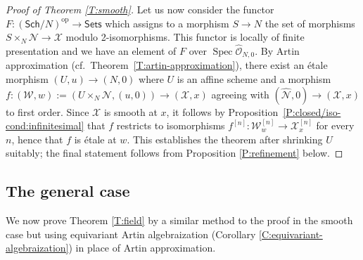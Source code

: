 \documentclass[a4paper]{amsart}
\theoremstyle{plain}
\theoremstyle{definition}
\theoremstyle{remark}
\numberwithin{equation}{section}
\newcommand{\op}{\mathrm{op}} %
\newcommand\cN{\mathcal{N}}
\newcommand\cW{\mathcal{W}}
\newcommand\cX{\mathcal{X}}
\newcommand\oh{\mathcal{O}}
\newcommand\co{\colon}
\DeclareMathOperator{\Spec}{Spec}
\newcommand\Sets{\mathsf{Sets}}
\renewcommand{\hat}{\widehat}
\newcommand{\Sch}{\mathsf{Sch}}
\begin{document}
\begin{proof}[Proof of Theorem \ref{T:smooth}]
Let us now consider the functor $F \co (\Sch/N)^\op \to \Sets$ which assigns to a
morphism $S \to N$ the set of morphisms $S \times_N \cN \to \cX$ modulo
2-isomorphisms.  This functor is locally of finite presentation and we have an
element of $F$ over $\Spec \hat{\oh}_{N,0}$.  By Artin approximation
\cite[Cor.~2.2]{artin-approx} (cf.\ Theorem~\ref{T:artin-approximation}), there
exist an \'etale morphism $(U,u) \to
(N,0)$ where $U$ is an affine scheme and a morphism $f\colon (\cW,w):=(U
\times_N \cN, (u,0) ) \to (\cX,x)$ agreeing with $(\hat{\cN},0) \to (\cX,x)$ to
first order.  Since $\cX$ is smooth at $x$, it follows by
Proposition~\ref{P:closed/iso-cond:infinitesimal} that $f$ restricts to isomorphisms
$f^{[n]}\colon \cW_w^{[n]}\to \cX_x^{[n]}$ for every $n$, hence that $f$ is \'etale at $w$.
This establishes the theorem after shrinking $U$ suitably; the final statement
follows from Proposition \ref{P:refinement}
below.
\end{proof}


\subsection{The general case} \label{S:proof}

We now prove Theorem \ref{T:field} by a similar method to the proof in the smooth case but using equivariant Artin algebraization (Corollary \ref{C:equivariant-algebraization}) in place of Artin approximation.
\end{document}
